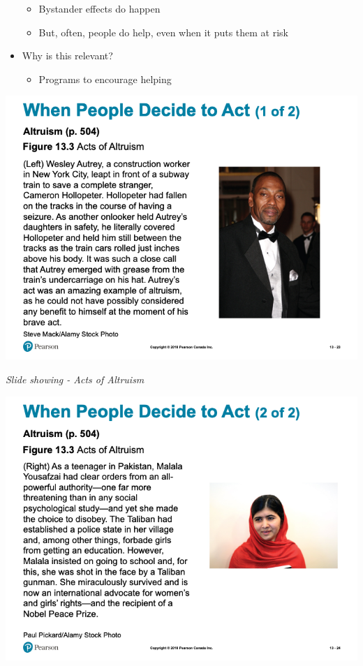 \documentclass[
]{book}
\providecommand{\tightlist}{%
  \setlength{\itemsep}{0pt}\setlength{\parskip}{0pt}}
\begin{document}
\begin{reflect}
\begin{itemize}
  \begin{itemize}
  \tightlist
  \item
    Bystander effects do happen\\
  \item
    But, often, people do help, even when it puts them at risk\\
  \end{itemize}
\item
  Why is this relevant?

  \begin{itemize}
  \tightlist
  \item
    Programs to encourage helping
  \end{itemize}
\end{itemize}

\includegraphics{assets/unit_6/slide_23.png}

\emph{Slide showing - Acts of Altruism}

\includegraphics{assets/unit_6/slide_24.png}


\end{reflect}
\end{document}
